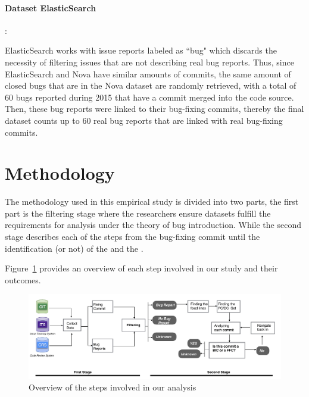 \documentclass[a4paper, 12pt]{book}
\begin{document}
\paragraph{Dataset ElasticSearch}: 

ElasticSearch works with issue reports labeled as ``bug" which discards the necessity of filtering issues that are not describing real bug reports. Thus, since ElasticSearch and Nova have similar amounts of commits, the same amount of closed bugs that are in the Nova dataset are randomly retrieved, with a total of 60 bugs reported during 2015 that have a commit merged into the code source. Then, these bug reports were linked to their bug-fixing commits, thereby the final dataset counts up to 60 real bug reports that are linked with real bug-fixing commits.




\section{Methodology}
\label{sec:methodology}

The methodology used in this empirical study is divided into two parts, the first part is the filtering stage where the researchers ensure datasets fulfill the requirements for analysis under the theory of bug introduction. While the second stage describes each of the steps from the bug-fixing commit until the identification (or not) of the \BIC and the \FFC.

Figure~\ref{fig:diagram} provides an overview of each step involved in our study and their outcomes.

\begin{figure}[ht]
\centering
\includegraphics[width=\columnwidth]{img/diagram.png}
\caption{Overview of the steps involved in our analysis  }
\label{fig:diagram}       %
\end{figure}
\end{document}

